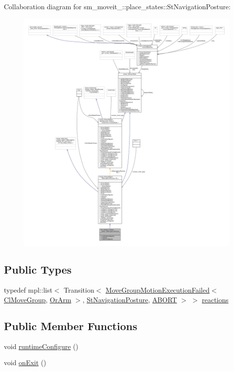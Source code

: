 Collaboration diagram for sm\+\_\+moveit\+\_\+:\+:place\+\_\+states\+:\+:St\+Navigation\+Posture\+:
\nopagebreak
\begin{figure}[H]
\begin{center}
\leavevmode
\includegraphics[width=350pt]{structsm__moveit__4_1_1place__states_1_1StNavigationPosture__coll__graph}
\end{center}
\end{figure}
\subsection*{Public Types}
\begin{DoxyCompactItemize}
\item 
typedef mpl\+::list$<$ Transition$<$ \hyperlink{structmoveit__z__client_1_1MoveGroupMotionExecutionFailed}{Move\+Group\+Motion\+Execution\+Failed}$<$ \hyperlink{classmoveit__z__client_1_1ClMoveGroup}{Cl\+Move\+Group}, \hyperlink{classsm__moveit__4_1_1OrArm}{Or\+Arm} $>$, \hyperlink{structsm__moveit__4_1_1place__states_1_1StNavigationPosture}{St\+Navigation\+Posture}, \hyperlink{classABORT}{A\+B\+O\+RT} $>$ $>$ \hyperlink{structsm__moveit__4_1_1place__states_1_1StNavigationPosture_a2588352d77d56f7a1f3df49fe37629d4}{reactions}
\end{DoxyCompactItemize}
\subsection*{Public Member Functions}
\begin{DoxyCompactItemize}
\item 
void \hyperlink{structsm__moveit__4_1_1place__states_1_1StNavigationPosture_aaf8ca02fa5a8185baf6bfc55731b1926}{runtime\+Configure} ()
\item 
void \hyperlink{structsm__moveit__4_1_1place__states_1_1StNavigationPosture_a1e0072ec1475de6876feebc591a0acce}{on\+Exit} ()
\end{DoxyCompactItemize}
